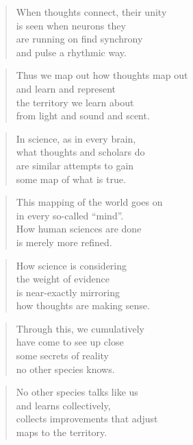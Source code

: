 \documentclass[14pt,a4paper]{article}
\begin{document}
\begin{verse}
When thoughts connect, their unity\\
is seen when neurons they\\
are running on find synchrony\\
and pulse a rhythmic way.
\end{verse}

\begin{verse}
Thus we map out how thoughts map out\\
and learn and represent\\
the territory we learn about\\
from light and sound and scent.
\end{verse}

\begin{verse}
In science, as in every brain,\\
what thoughts and scholars do\\
are similar attempts to gain\\
some map of what is true.
\end{verse}

\begin{verse}
This mapping of the world goes on\\
in every so-called “mind”.\\
How human sciences are done\\
is merely more refined.
\end{verse}

\begin{verse}
How science is considering\\
the weight of evidence\\
is near-exactly mirroring\\
how thoughts are making sense.
\end{verse}

\begin{verse}
Through this, we cumulatively\\
have come to see up close\\
some secrets of reality\\
no other species knows.
\end{verse}

\begin{verse}
No other species talks like us\\
and learns collectively,\\
collects improvements that adjust\\
maps to the territory.
\end{verse}
\end{document}

